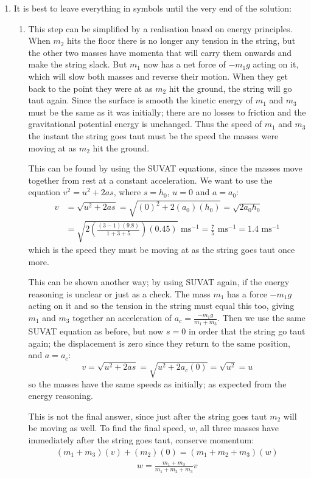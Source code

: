 \begin{problem}[A1969AMIIQ2a]
{\begin{enumerate}
is the initial acceleration.
	\item It is best to leave everything in symbols until the very end of the solution:
	\begin{enumerate}
		\item This step can be simplified by a realisation based on energy principles. When $m_{2}$ hits the floor there is no longer any tension in the string, but the other two masses have momenta that will carry them onwards and make the string slack. But $m_{1}$ now has a net force of $-m_{1}g$ acting on it, which will slow both masses and reverse their motion. When they get back to the point they were at as $m_{2}$ hit the ground, the string will go taut again. Since the surface is smooth the kinetic energy of $m_{1}$ and $m_{3}$ must be the same as it was initially; there are no losses to friction and the gravitational potential energy is unchanged. Thus the speed of $m_{1}$ and $m_{3}$ the instant the string goes taut must be the speed the masses were moving at as $m_{2}$ hit the ground.

This can be found by using the SUVAT equations, since the masses move together from rest at a constant acceleration. We want to use the equation $v^{2} = u^{2} + 2as$, where $s = h_{0}$, $u = 0$ and $a = a_{0}$:
\begin{align*} v &= \sqrt{u^{2} + 2as} = \sqrt{(0)^{2} + 2(a_{0})(h_{0})} = \sqrt{2a_{0}h_{0}} \\ &= \sqrt{2\left(\frac{(3 - 1)(9.8)}{1 + 3 + 5}\right)(0.45)} \textrm{ ms}^{-1} = \frac{7}{5} \textrm{ ms}^{-1} = 1.4 \textrm{ ms}^{-1}  \end{align*}
which is the speed they must be moving at as the string goes taut once more. 

This can be shown another way; by using SUVAT again, if the energy reasoning is unclear or just as a check. The mass $m_{1}$ has a force $-m_{1}g$ acting on it and so the tension in the string must equal this too, giving $m_{1}$ and $m_{3}$ together an acceleration of $a_{c} = \frac{-m_{1}g}{m_{1} + m_{3}}$. Then we use the same SUVAT equation as before, but now $s = 0$ in order that the string go taut again; the displacement is zero since they return to the same position, and $a = a_{c}$:
\begin{equation*} v = \sqrt{u^{2} + 2as} = \sqrt{u^{2} + 2a_{c}(0)} = \sqrt{u^{2}} = u \end{equation*}
so the masses have the same speeds as initially; as expected from the energy reasoning.

This is not the final answer, since just after the string goes taut $m_{2}$ will be moving as well. To find the final speed, $w$, all three masses have immediately after the string goes taut, conserve momentum:
\begin{align*} (m_{1} + m_{3})(v) + (m_{2})(0) = (m_{1} + m_{2} + m_{3})(w) \end{align*}\begin{align*} w = \frac{m_{1} + m_{3}}{m_{1} + m_{2} + m_{3}} v \end{align*}


\end{enumerate}
\end{enumerate}}
\end{problem}
